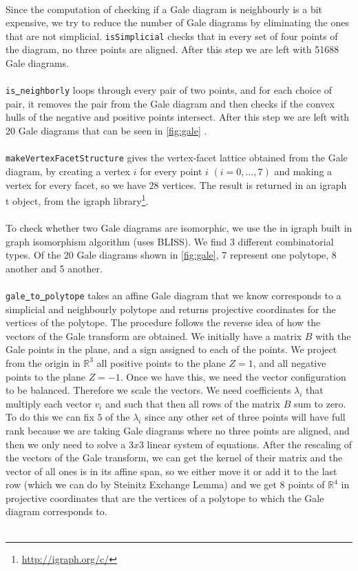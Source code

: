 \documentclass[paper=a4, fontsize=11pt]{scrartcl} %
\newcommand{\RR}{{\mathbb R}}
\theoremstyle{definition}
\begin{document}
\\
Since the computation of checking if a Gale diagram is neighbourly is a bit expensive, we try to reduce the number of Gale diagrams by eliminating the ones that are not simplicial. \texttt{isSimplicial} checks that in every set of four points of the diagram, no three points are aligned. After this step we are left with 51688 Gale diagrams.\\
\\
\texttt{is\underline{ }neighborly} loops through every pair of two points, and for each choice of pair, it removes the pair from the Gale diagram and then checks if the convex hulls of the negative and positive points intersect. After this step we are left with 20 Gale diagrams that can be seen in \ref{fig:gale} .\\
\\
\texttt{makeVertexFacetStructure} gives the vertex-facet lattice obtained from the Gale diagram, by creating a vertex $i$ for every point $i$ $(i=0,\ldots,7)$ and making a vertex for every facet, so we have $28$ vertices. The result is returned in an igraph\underline{ }t object, from the igraph library\footnote{\url{http://igraph.org/c/}}. \\
\\
To check whether two Gale diagrams are isomorphic, we use the in igraph built in graph isomorphism algorithm (uses BLISS). We find 3 different combinatorial types. Of the 20 Gale diagrams shown in \ref{fig:gale}, 7 represent one polytope, 8 another and 5 another.\\
\\
\texttt{gale\underline{ }to\underline{ }polytope} takes an affine Gale diagram that we know corresponds to a simplicial and neighbourly polytope and returns projective coordinates for the vertices of the polytope. The procedure follows the reverse idea of how the vectors of the Gale transform are obtained. We initially have a matrix $B$ with the Gale points in the plane, and a sign assigned to each of the points. We project from the origin in $\RR^3$ all positive points to the plane $Z = 1$, and all negative points to the plane $Z = -1$. Once we have this, we need the vector configuration to be balanced. Therefore we scale the vectors. We need coefficients $\lambda_i$ that multiply each vector $v_i$ and such that then all rows of the matrix $B$ sum to zero. To do this we can fix $5$ of the $\lambda_i$ since any other set of three points will have full rank because we are taking Gale diagrams where no three points are aligned, and then we only need to solve a $3x3$ linear system of equations. After the rescaling of the vectors of the Gale transform, we can get the kernel of their matrix and the vector of all ones is in its affine span, so we either move it or add it to the last row (which we can do by Steinitz Exchange Lemma) and we get 8 points of $\RR^4$ in projective coordinates that are the vertices of a polytope to which the Gale diagram corresponds to.\\
\\
\end{document}
